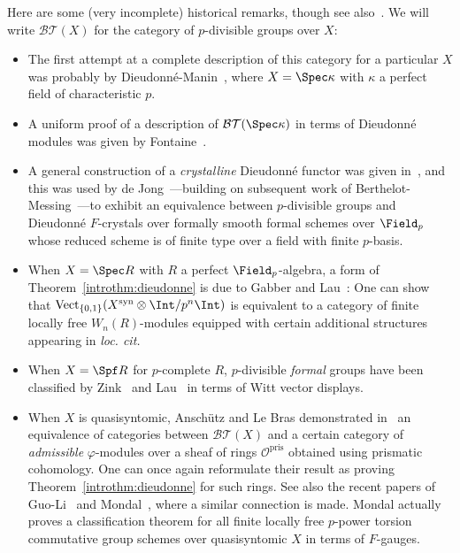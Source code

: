 \documentclass[10pt]{amsart}
\begin{document}
\begin{introrem}
\label{introrem:historical}
Here are some (very incomplete) historical remarks, though see also~\cite[\S 7]{drinfeld2024shimurian}. We will write $\mathcal{BT}(X)$ for the category of $p$-divisible groups over $X$:
\begin{itemize}
   \item The first attempt at a complete description of this category for a particular $X$ was probably by Dieudonn\'e-Manin~\cite{MR0157972}, where $X = \Spec \kappa$ with $\kappa$ a perfect field of characteristic $p$. 
   \item A uniform proof of a description of $\mathcal{BT}(\Spec\kappa)$ in terms of Dieudonn\'e modules was given by Fontaine~\cite{MR0498610}.
   \item A general construction of a \emph{crystalline} Dieudonn\'e functor was given in~\cite{bbm:cris_ii}, and this was used by de Jong~\cite{dejong:formal_rigid}---building on subsequent work of Berthelot-Messing~\cite{Berthelot1990-gp}---to exhibit an equivalence between $p$-divisible groups and Dieudonn\'e $F$-crystals over formally smooth formal schemes over $\Field_p$ whose reduced scheme is of finite type over a field with finite $p$-basis.
   \item When $X = \Spec R$ with $R$ a perfect $\Field_p$-algebra, a form of Theorem~\ref{introthm:dieudonne} is due to Gabber and Lau~\cite{MR2983008}: One can show that $\mathrm{Vect}_{\{0,1\}}(X^{\mathrm{syn}}\otimes\Int/p^n\Int)$ is equivalent to a category of finite locally free $W_n(R)$-modules equipped with certain additional structures appearing in \emph{loc. cit.}
   \item When $X = \Spf R$ for $p$-complete $R$, $p$-divisible \emph{formal} groups have been classified by Zink~\cite{MR1827031} and Lau~\cite{MR2983008} in terms of Witt vector displays.

   \item When $X$ is quasisyntomic, Ansch\"utz and Le Bras demonstrated in~\cite{MR4530092} an equivalence of categories between $\mathcal{BT}(X)$ and a certain category of \emph{admissible} $\varphi$-modules over a sheaf of rings $\mathcal{O}^{\mathrm{pris}}$ obtained using prismatic cohomology. One can once again reformulate their result as proving Theorem~\ref{introthm:dieudonne} for such rings. See also the recent papers of Guo-Li~\cite{guo2023frobenius} and Mondal~\cite{Mondal2024-cy}, where a similar connection is made. Mondal actually proves a classification theorem for all finite locally free $p$-power torsion commutative group schemes over quasisyntomic $X$ in terms of $F$-gauges.


\end{itemize}
\end{introrem}
\end{document}
